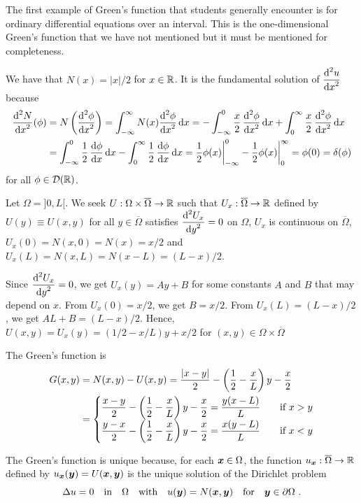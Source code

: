 \begin{egg}
The first example of Green's function that students generally
encounter is for ordinary differential equations over an interval.
This is the one-dimensional Green's function that we have not
mentioned but it must be mentioned for completeness.

We have that $N(x) = |x|/2$ for $x \in \mathbb{R}$.  It is the
fundamental solution of $\displaystyle \frac{\displaystyle \mathrm{d}^{2}{u}} {\displaystyle \mathrm{d}{x}^{2}}$ because
\begin{align*}
\frac{\displaystyle \mathrm{d}^{2}{N}} {\displaystyle \mathrm{d}{x}^{2}}(\phi) &= N\left(\frac{\displaystyle \mathrm{d}^{2}{\phi}} {\displaystyle \mathrm{d}{x}^{2}}\right)
= \int_{-\infty}^\infty N(x)\frac{\displaystyle \mathrm{d}^{2}{\phi}} {\displaystyle \mathrm{d}{x}^{2}} \,\mathrm{d}{x}
= -\int_{-\infty}^0 \frac{x}{2}\,\frac{\displaystyle \mathrm{d}^{2}{\phi}} {\displaystyle \mathrm{d}{x}^{2}} \,\mathrm{d}{x}
+ \int_0^\infty \frac{x}{2}\,\frac{\displaystyle \mathrm{d}^{2}{\phi}} {\displaystyle \mathrm{d}{x}^{2}} \,\mathrm{d}{x} \\
&= \int_{-\infty}^0 \frac{1}{2}\,\frac{\mathrm{d}\phi}{\mathrm{d}{x}} \,\mathrm{d}{x}
- \int_0^\infty \frac{1}{2}\,\frac{\mathrm{d}\phi}{\mathrm{d}{x}} \,\mathrm{d}{x}
= \frac{1}{2} \phi(x)\bigg|_{-\infty}^0 - \frac{1}{2} \phi(x)\bigg|_0^\infty
= \phi(0) = \delta(\phi)
\end{align*}
for all $\phi \in \mathcal{D}(\mathbb{R})$.

Let $\Omega = ]0,L[$.  We seek $U:\Omega \times \overline{\Omega} \to \mathbb{R}$
such that $U_x:\overline{\Omega} \to \mathbb{R}$ defined by
$U(y) \equiv U(x,y)$ for all $y \in \overline{\Omega}$ satisfies
$\displaystyle \frac{\displaystyle \mathrm{d}^{2}{U_x}} {\displaystyle \mathrm{d}{y}^{2}} = 0$ on $\Omega$, $U_x$ is continuous
on $\overline{\Omega}$, $U_x(0) = N(x,0) = N(x) = x/2$ and
$U_x(L) = N(x,L) = N(x-L) = (L-x)/2$.

Since $\displaystyle \frac{\displaystyle \mathrm{d}^{2}{U_x}} {\displaystyle \mathrm{d}{y}^{2}} = 0$, we get $U_x(y) = Ay + B$
for some constants $A$ and $B$ that may depend on $x$.  From
$U_x(0) = x/2$, we get $B= x/2$.  From 
$U_x(L) = (L-x)/2$, we get $AL + B = (L-x)/2$.  Hence,
$U(x,y) = U_x(y) = (1/2 -x/L)y + x/2$ for
$(x,y) \in \Omega \times \overline{\Omega}$

The Green's function is
\begin{align*}
G(x,y) &= N(x,y) - U(x,y)
= \frac{|x-y|}{2} - \left(\frac{1}{2} -\frac{x}{L}\right)y -
\frac{x}{2} \\
&= \begin{cases}
\displaystyle
\frac{x-y}{2} - \left(\frac{1}{2} -\frac{x}{L}\right)y - \frac{x}{2}
= \frac{y(x-L)}{L} & \quad \text{if} \ x > y \\
\displaystyle
\frac{y-x}{2} - \left(\frac{1}{2} -\frac{x}{L}\right)y - \frac{x}{2}
= \frac{x(y-L)}{L} & \quad \text{if} \ x < y
\end{cases}
\end{align*}
\end{egg}

The Green's function is unique because, for each ${\bm{x}} \in \Omega$,
the function $u_{{\bm{x}}}:\overline{\Omega}\rightarrow \mathbb{R}$ defined by
$u_{{\bm{x}}}({\bm{y}}) = U({\bm{x}},{\bm{y}})$ is the unique
solution of the Dirichlet problem
\begin{equation} \label{laplace_RefGFDP}
\Delta u = 0 \quad \text{in} \quad \Omega \quad
\text{with} \quad u({\bm{y}}) = N({\bm{x}},{\bm{y}}) \quad
\text{for} \quad {\bm{y}}\in \partial \Omega \ .
\end{equation}

